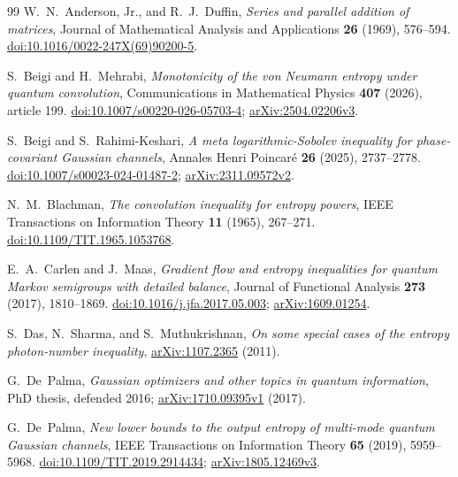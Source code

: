 \begin{thebibliography}{99}
W.~N.~Anderson, Jr., and R.~J.~Duffin,
\emph{Series and parallel addition of matrices},
Journal of Mathematical Analysis and Applications \textbf{26} (1969), 576--594.
\href{https://doi.org/10.1016/0022-247X(69)90200-5}{\mbox{doi:10.1016/0022-247X(69)90200-5}}.

S.~Beigi and H.~Mehrabi,
\emph{Monotonicity of the von Neumann entropy under quantum convolution},
Communications in Mathematical Physics \textbf{407} (2026), article 199.
\href{https://doi.org/10.1007/s00220-026-05703-4}{doi:10.1007/s00220-026-05703-4};
\href{https://arxiv.org/abs/2504.02206v3}{arXiv:2504.02206v3}.

S.~Beigi and S.~Rahimi-Keshari,
\emph{A meta logarithmic-Sobolev inequality for phase-covariant Gaussian channels},
Annales Henri Poincar\'e \textbf{26} (2025), 2737--2778.
\href{https://doi.org/10.1007/s00023-024-01487-2}{doi:10.1007/s00023-024-01487-2};
\href{https://arxiv.org/abs/2311.09572v2}{arXiv:2311.09572v2}.

N.~M.~Blachman,
\emph{The convolution inequality for entropy powers},
IEEE Transactions on Information Theory \textbf{11} (1965), 267--271.
\href{https://doi.org/10.1109/TIT.1965.1053768}{doi:10.1109/TIT.1965.1053768}.

E.~A.~Carlen and J.~Maas,
\emph{Gradient flow and entropy inequalities for quantum Markov semigroups with detailed balance},
Journal of Functional Analysis \textbf{273} (2017), 1810--1869.
\href{https://doi.org/10.1016/j.jfa.2017.05.003}{doi:10.1016/j.jfa.2017.05.003};
\href{https://arxiv.org/abs/1609.01254}{arXiv:1609.01254}.

S.~Das, N.~Sharma, and S.~Muthukrishnan,
\emph{On some special cases of the entropy photon-number inequality},
\href{https://arxiv.org/abs/1107.2365}{arXiv:1107.2365} (2011).

G.~De~Palma,
\emph{Gaussian optimizers and other topics in quantum information},
PhD thesis, defended 2016;
\href{https://arxiv.org/abs/1710.09395v1}{arXiv:1710.09395v1} (2017).

G.~De~Palma,
\emph{New lower bounds to the output entropy of multi-mode quantum Gaussian channels},
IEEE Transactions on Information Theory \textbf{65} (2019), 5959--5968.
\href{https://doi.org/10.1109/TIT.2019.2914434}{doi:10.1109/TIT.2019.2914434};
\href{https://arxiv.org/abs/1805.12469v3}{arXiv:1805.12469v3}.


\end{thebibliography}
